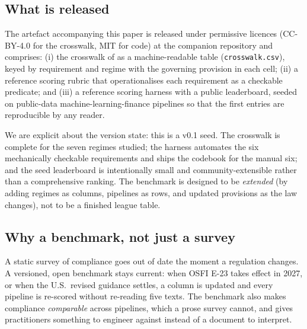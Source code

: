 \subsection{What is released}\label{sec:released}

The artefact accompanying this paper is released under permissive licences (CC-BY-4.0 for the crosswalk, MIT for code) at the companion repository and comprises: (i) the crosswalk of  as a machine-readable table (\texttt{crosswalk.csv}), keyed by requirement and regime with the governing provision in each cell; (ii) a reference scoring rubric that operationalises each requirement as a checkable predicate; and (iii) a reference scoring harness with a public leaderboard, seeded on public-data machine-learning-finance pipelines so that the first entries are reproducible by any reader.

We are explicit about the version state: this is a v0.1 seed. The crosswalk is complete for the seven regimes studied; the harness automates the six mechanically checkable requirements and ships the codebook for the manual six; and the seed leaderboard is intentionally small and community-extensible rather than a comprehensive ranking. The benchmark is designed to be \emph{extended} (by adding regimes as columns, pipelines as rows, and updated provisions as the law changes), not to be a finished league table.

\subsection{Why a benchmark, not just a survey}\label{sec:why_benchmark}

A static survey of compliance goes out of date the moment a regulation changes. A versioned, open benchmark stays current: when OSFI E-23 takes effect in 2027, or when the U.S.\ revised guidance settles, a column is updated and every pipeline is re-scored without re-reading five texts. The benchmark also makes compliance \emph{comparable} across pipelines, which a prose survey cannot, and gives practitioners something to engineer against instead of a document to interpret.
